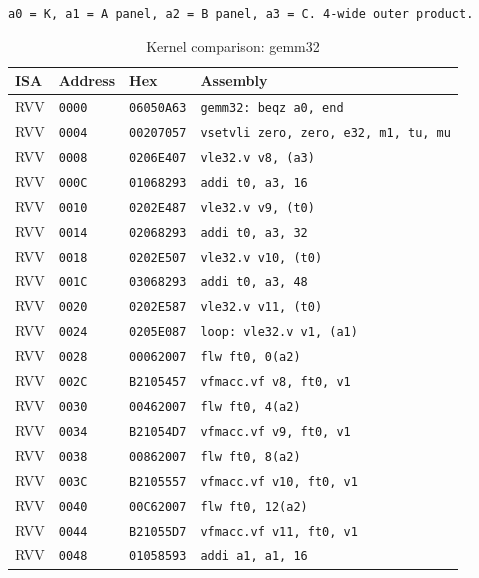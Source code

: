 \begin{table}[htbp]
\centering
\caption{Kernel comparison: gemm32}
\begingroup
\scriptsize
\setlength{\tabcolsep}{4pt}
\noindent \texttt{a0 = K, a1 = A panel, a2 = B panel, a3 = C. 4-wide outer product.}\par
\vspace{0.6ex}
\begin{tabular}{@{}l|l|l|p{7.2cm}@{}}
\toprule
ISA & Address & Hex & Assembly \\
\midrule
RVV & \texttt{0000} & \texttt{06050A63} & \texttt{gemm32: beqz a0, end} \\
RVV & \texttt{0004} & \texttt{00207057} & \texttt{vsetvli zero, zero, e32, m1, tu, mu} \\
RVV & \texttt{0008} & \texttt{0206E407} & \texttt{vle32.v v8, (a3)} \\
RVV & \texttt{000C} & \texttt{01068293} & \texttt{addi t0, a3, 16} \\
RVV & \texttt{0010} & \texttt{0202E487} & \texttt{vle32.v v9, (t0)} \\
RVV & \texttt{0014} & \texttt{02068293} & \texttt{addi t0, a3, 32} \\
RVV & \texttt{0018} & \texttt{0202E507} & \texttt{vle32.v v10, (t0)} \\
RVV & \texttt{001C} & \texttt{03068293} & \texttt{addi t0, a3, 48} \\
RVV & \texttt{0020} & \texttt{0202E587} & \texttt{vle32.v v11, (t0)} \\
RVV & \texttt{0024} & \texttt{0205E087} & \texttt{loop: vle32.v v1, (a1)} \\
RVV & \texttt{0028} & \texttt{00062007} & \texttt{flw ft0, 0(a2)} \\
RVV & \texttt{002C} & \texttt{B2105457} & \texttt{vfmacc.vf v8, ft0, v1} \\
RVV & \texttt{0030} & \texttt{00462007} & \texttt{flw ft0, 4(a2)} \\
RVV & \texttt{0034} & \texttt{B21054D7} & \texttt{vfmacc.vf v9, ft0, v1} \\
RVV & \texttt{0038} & \texttt{00862007} & \texttt{flw ft0, 8(a2)} \\
RVV & \texttt{003C} & \texttt{B2105557} & \texttt{vfmacc.vf v10, ft0, v1} \\
RVV & \texttt{0040} & \texttt{00C62007} & \texttt{flw ft0, 12(a2)} \\
RVV & \texttt{0044} & \texttt{B21055D7} & \texttt{vfmacc.vf v11, ft0, v1} \\
RVV & \texttt{0048} & \texttt{01058593} & \texttt{addi a1, a1, 16} \\

\end{tabular}
\end{table}
